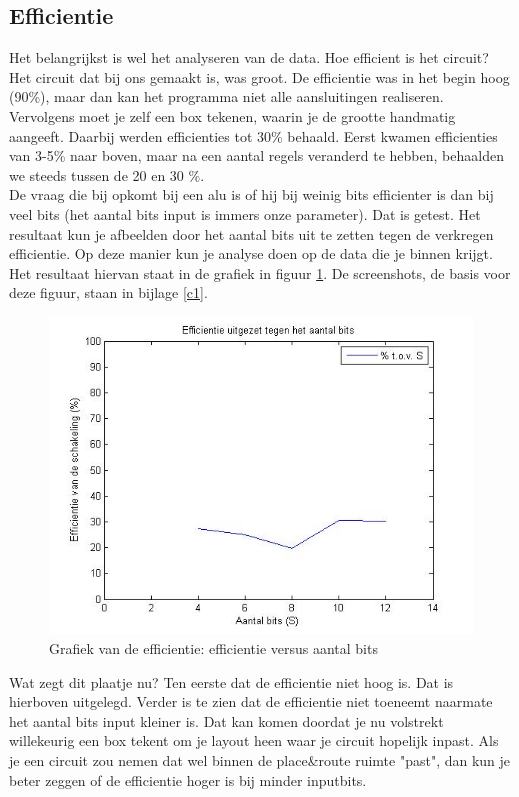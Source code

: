 \documentclass{article}
\begin{document}
\subsection {Efficientie}
Het belangrijkst is wel het analyseren van de data. Hoe efficient is het circuit? Het circuit dat bij ons gemaakt is, was groot. De efficientie was in het begin hoog (90\%), maar dan kan het programma niet alle aansluitingen realiseren. Vervolgens moet je zelf een box tekenen, waarin je de grootte handmatig aangeeft. Daarbij werden efficienties tot 30\% behaald. Eerst kwamen efficienties van 3-5\% naar boven, maar na een aantal regels veranderd te hebben, behaalden we steeds tussen de 20 en 30 \%.  \newline \\
De vraag die bij opkomt bij een alu is of hij bij weinig bits efficienter is dan bij veel bits (het aantal bits input is immers onze parameter). Dat is getest. Het resultaat kun je afbeelden door het aantal bits uit te zetten tegen de verkregen efficientie. Op deze manier kun je analyse doen op de data die je binnen krijgt. Het resultaat hiervan staat in de grafiek in figuur \ref{a1}. De screenshots, de basis voor deze figuur, staan in bijlage \ref{c1}. 
\begin{figure} [h!]
\begin{center}
\includegraphics [scale = 0.5] {figures/efftot}
\caption{Grafiek van de efficientie: efficientie versus aantal bits}
\label{a1}
\end{center}
\end{figure}
Wat zegt dit plaatje nu? Ten eerste dat de efficientie niet hoog is. Dat is hierboven uitgelegd. Verder is te zien dat de efficientie niet toeneemt naarmate het aantal bits input kleiner is. Dat kan komen doordat je nu volstrekt willekeurig een box tekent om je layout heen waar je circuit hopelijk inpast. Als je een circuit zou nemen dat wel binnen de place\&route ruimte "past", dan kun je beter zeggen of de efficientie hoger is bij minder inputbits. 
\end{document}
